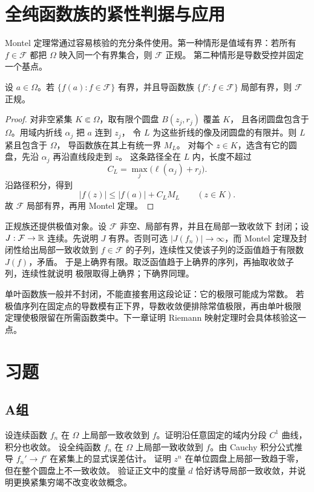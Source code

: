 \section{全纯函数族的紧性判据与应用}

Montel 定理常通过容易核验的充分条件使用。第一种情形是值域有界：若所有
$f\in\mathcal F$ 都把 $\Omega$ 映入同一个有界集合，则 $\mathcal F$ 正规。
第二种情形是导数受控并固定一个基点。

\begin{proposition}[导数判据]\label{prop:normal-derivative-criterion}
设 $a\in\Omega$。若 $\{f(a):f\in\mathcal F\}$ 有界，并且导函数族
$\{f':f\in\mathcal F\}$ 局部有界，则 $\mathcal F$ 正规。
\end{proposition}

\begin{proof}
对非空紧集 $K\Subset\Omega$，取有限个圆盘 $B(z_j,r_j)$ 覆盖 $K$，
且各闭圆盘包含于 $\Omega$。用域内折线 $\alpha_j$ 把 $a$ 连到 $z_j$，
令 $L$ 为这些折线的像及闭圆盘的有限并。则 $L$ 紧且包含于 $\Omega$，
导函数族在其上有统一界 $M_L$。
对每个 $z\in K$，选含有它的圆盘，先沿 $\alpha_j$ 再沿直线段走到 $z$。
这条路径全在 $L$ 内，长度不超过
\[
 C_L=\max_j\bigl(\ell(\alpha_j)+r_j\bigr).
\]
沿路径积分，得到
\[
 |f(z)|\le |f(a)|+C_LM_L\qquad(z\in K).
\]
故 $\mathcal F$ 局部有界，再用 Montel 定理。
\end{proof}

正规族还提供极值对象。设 $\mathcal F$ 非空、局部有界，并且在局部一致收敛下
封闭；设 $J:\mathcal F\to\mathbb{R}$ 连续。先说明 $J$ 有界。否则可选
$|J(f_n)|\to\infty$，而 Montel 定理及封闭性给出局部一致收敛到
$f\in\mathcal F$ 的子列，连续性又使该子列的泛函值趋于有限数 $J(f)$，矛盾。
于是上确界有限。取泛函值趋于上确界的序列，再抽取收敛子列，连续性就说明
极限取得上确界；下确界同理。

单叶函数族一般并不封闭，不能直接套用这段论证：它的极限可能成为常数。
若极值序列在固定点的导数模有正下界，导数收敛便排除常值极限，再由单叶极限
定理使极限留在所需函数类中。下一章证明 Riemann 映射定理时会具体核验这一点。

\section*{习题}

\subsection*{A组}
\begin{enumerate}[label=\textbf{\thechapter.\arabic*.}]
设连续函数 $f_n$ 在 $\Omega$ 上局部一致收敛到 $f$。证明沿任意固定的域内分段 $C^1$ 曲线，积分也收敛。
设全纯函数 $f_n$ 在 $\Omega$ 上局部一致收敛到 $f$。由 Cauchy 积分公式推导 $f_n'\to f'$ 在紧集上的显式误差估计。
证明 $z^n$ 在单位圆盘上局部一致趋于零，但在整个圆盘上不一致收敛。
验证正文中的度量 $d$ 恰好诱导局部一致收敛，并说明更换紧集穷竭不改变收敛概念。
\end{enumerate}

